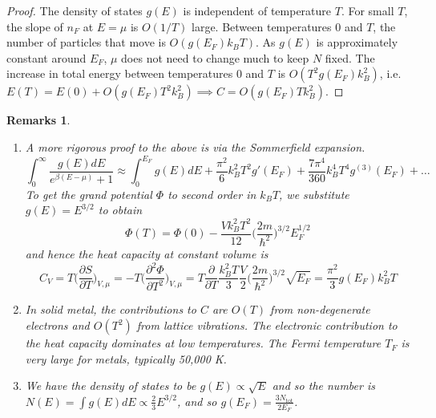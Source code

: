 \documentclass[a4paper]{article}
\newtheorem{remarks}{Remarks}[section]
\theoremstyle{new}
\begin{document}
\begin{proof}
The density of states $g(E)$ is independent of temperature $T$. For small $T$, the slope of $n_F$ at $E=\mu$ is $O(1/T)$ large. Between temperatures 0 and $T$, the number of particles that move is $O(g(E_F)k_BT)$. As $g(E)$ is approximately constant around $E_F$, $\mu$ does not need to change much to keep $N$ fixed. The increase in total energy between temperatures 0 and $T$ is $O(T^2g(E_F)k_B^2)$, i.e. $E(T)=E(0)+O(g(E_F)T^2k_B^2)\implies C=O(g(E_F)Tk_B^2)$. 
\end{proof}
\begin{center}
\end{center}
\begin{remarks}\leavevmode
\begin{enumerate}
\item A more rigorous proof to the above is via the Sommerfield expansion. 
$$\int_0^\infty\frac{g(E)dE}{e^{\beta(E-\mu)}+1}\approx\int_0^{E_F}g(E)dE+\frac{\pi^2}{6}k_B^2T^2g'(E_F)+\frac{7\pi^4}{360}k_B^4T^4g^{(3)}(E_F)+\dots$$
To get the grand potential $\Phi$ to second order in $k_BT$, we substitute $g(E)=E^{3/2}$ to obtain
$$\Phi(T)=\Phi(0)-\frac{Vk_B^2T^2}{12}\bigg(\frac{2m}{\hbar^2}\bigg)^{3/2}E_F^{1/2}$$
and hence the heat capacity at constant volume is
$$C_V=T\bigg(\frac{\partial S}{\partial T}\bigg)_{V,\mu}=-T\bigg(\frac{\partial^2\Phi}{\partial T^2}\bigg)_{V,\mu}=T\frac{\partial}{\partial T}\frac{k_B^2T}{3}\frac{V}{2}\bigg(\frac{2m}{\hbar^2}\bigg)^{3/2}\sqrt{E_F}=\frac{\pi^2}{3}g(E_F)k_B^2T$$
\item In solid metal, the contributions to $C$ are $O(T)$ from non-degenerate electrons and $O(T^2)$ from lattice vibrations. The electronic contribution to the heat capacity dominates at low temperatures. The Fermi temperature $T_F$ is very large for metals, typically 50,000 K.
\item We have the density of states to be $g(E)\propto\sqrt{E}$ and so the number is $N(E)=\int g(E)dE\propto\frac{2}{3}E^{3/2}$, and so $g(E_F)=\frac{3N_{\text{tot}}}{2E_F}$.
\end{enumerate}
\end{remarks}
\newpage
\end{document}
